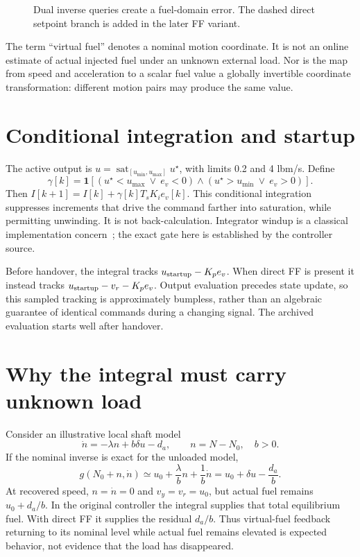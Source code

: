 \documentclass[11pt,a4paper,oneside]{report}
\newcommand{\sat}{\operatorname{sat}}
\newcommand{\blockfig}[3]{\begin{figure}[htbp]\centering\resizebox{.98\linewidth}{!}{#1}\caption{#2}\label{fig:#3}\end{figure}}
\begin{document}
\blockfig{\diagramVirtual}{Dual inverse queries create a fuel-domain error. The dashed direct setpoint branch is added in the later FF variant.}{virtual}
The term ``virtual fuel'' denotes a nominal motion coordinate. It is not an online estimate of actual injected fuel under an unknown external load. Nor is the map from speed and acceleration to a scalar fuel value a globally invertible coordinate transformation: different motion pairs may produce the same value.

\section{Conditional integration and startup}
The active output is $u=\sat_{[u_{\min},u_{\max}]}u^\star$, with limits 0.2 and 4 lbm/s. Define
\begin{equation}
\gamma[k]=\mathbf1\!\left[(u^\star<u_{\max}\ \lor\ e_v<0)
\land(u^\star>u_{\min}\ \lor\ e_v>0)\right].
\end{equation}
Then $I[k+1]=I[k]+\gamma[k]T_sK_i e_v[k]$. This conditional integration suppresses increments that drive the command farther into saturation, while permitting unwinding. It is not back-calculation. Integrator windup is a classical implementation concern~\cite{windup}; the exact gate here is established by the controller source.

Before handover, the integral tracks $u_{\rm startup}-K_pe_v$. When direct FF is present it instead tracks $u_{\rm startup}-v_r-K_pe_v$. Output evaluation precedes state update, so this sampled tracking is approximately bumpless, rather than an algebraic guarantee of identical commands during a changing signal. The archived evaluation starts well after handover.

\section{Why the integral must carry unknown load}
Consider an illustrative local shaft model
\begin{equation}
\dot n=-\lambda n+b\delta u-d_a,\qquad n=N-N_0,\quad b>0.
\label{eq:localplant}
\end{equation}
If the nominal inverse is exact for the unloaded model,
\begin{equation}
g(N_0+n,\dot n)\simeq u_0+\frac{\lambda}{b}n+\frac1b\dot n
=u_0+\delta u-\frac{d_a}{b}.
\end{equation}
At recovered speed, $n=\dot n=0$ and $v_y=v_r=u_0$, but actual fuel remains $u_0+d_a/b$. In the original controller the integral supplies that total equilibrium fuel. With direct FF it supplies the residual $d_a/b$. Thus virtual-fuel feedback returning to its nominal level while actual fuel remains elevated is expected behavior, not evidence that the load has disappeared.
\end{document}
